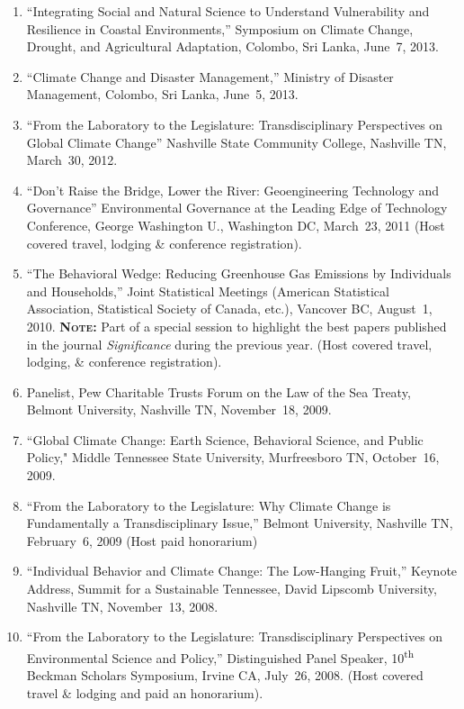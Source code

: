 %
%
\begin{enumerate}
\item ``Integrating Social and Natural Science to Understand Vulnerability and Resilience in Coastal Environments,'' Symposium on Climate Change, Drought, and Agricultural Adaptation, Colombo, Sri Lanka, June~7, 2013.
\item ``Climate Change and Disaster Management,'' Ministry of Disaster Management, Colombo, Sri Lanka, June~5, 2013.
\item ``From the Laboratory to the Legislature: Transdisciplinary Perspectives on Global Climate Change'' Nashville State Community College, Nashville TN, March~30, 2012.
\item ``Don't Raise the Bridge, Lower the River: Geoengineering Technology and Governance'' Environmental Governance at the Leading Edge of Technology Conference, George Washington U., Washington DC, March~23, 2011 (Host covered travel, lodging \& conference registration).
\item ``The Behavioral Wedge: Reducing Greenhouse Gas Emissions by Individuals and Households,'' Joint Statistical Meetings (American Statistical Association, Statistical Society of Canada, etc.), Vancover BC, August~1, 2010. {\bfseries\scshape Note:} Part of a special session to highlight the best papers published in the journal \textit{Significance\/} during the previous year. (Host covered travel, lodging, \& conference registration).
\item Panelist, Pew Charitable Trusts Forum on the Law of the Sea Treaty, Belmont University, Nashville TN, November~18, 2009.
\item ``Global Climate Change: Earth Science, Behavioral Science, and Public Policy," Middle Tennessee State University, Murfreesboro TN, October~16, 2009.
\item ``From the Laboratory to the Legislature: Why Climate Change is Fundamentally a Transdisciplinary Issue,'' Belmont University, Nashville TN, February~6, 2009 (Host paid honorarium)
\item ``Individual Behavior and Climate Change: The Low-Hanging Fruit,'' Keynote Address, Summit for a Sustainable Tennessee, David Lipscomb University, Nashville TN, November~13, 2008.
\item ``From the Laboratory to the Legislature: Transdisciplinary Perspectives on Environmental Science and Policy,'' Distinguished Panel Speaker, 10\textsuperscript{th} Beckman Scholars Symposium, Irvine CA, July~26, 2008. (Host covered travel \& lodging and paid an honorarium).

\end{enumerate}
